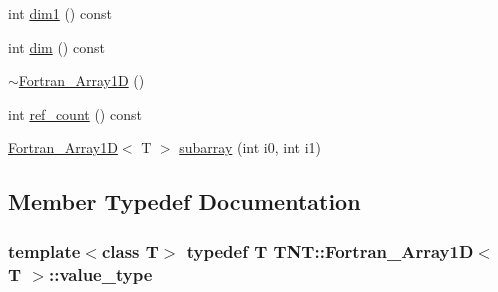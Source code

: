 \begin{DoxyCompactItemize}
\item 
int \hyperlink{classTNT_1_1Fortran__Array1D_a38da25238999b4d5c23201cb5d748e46}{dim1} () const 
\item 
int \hyperlink{classTNT_1_1Fortran__Array1D_a60ce550d4a6dba1f8fbaa287a0cb7d0b}{dim} () const 
\item 
\hyperlink{classTNT_1_1Fortran__Array1D_aed735c33f3ff8f64c61c86ac4b163c1c}{$\sim$\-Fortran\-\_\-\-Array1\-D} ()
\item 
int \hyperlink{classTNT_1_1Fortran__Array1D_ad80b611a5af26ccd3ef62b0f1395e2f7}{ref\-\_\-count} () const 
\item 
\hyperlink{classTNT_1_1Fortran__Array1D}{Fortran\-\_\-\-Array1\-D}$<$ T $>$ \hyperlink{classTNT_1_1Fortran__Array1D_a6d4aad7e6e4ef4dfd1cf26e86a1d1311}{subarray} (int i0, int i1)
\end{DoxyCompactItemize}


\subsection{Member Typedef Documentation}
\hypertarget{classTNT_1_1Fortran__Array1D_af213c3571890bd98e08eb5e93e100a1a}{
\subsubsection[{value\-\_\-type}]{\setlength{\rightskip}{0pt plus 5cm}template$<$class T$>$ typedef T {\bf T\-N\-T\-::\-Fortran\-\_\-\-Array1\-D}$<$ T $>$\-::{\bf value\-\_\-type}}}\label{classTNT_1_1Fortran__Array1D_af213c3571890bd98e08eb5e93e100a1a}


